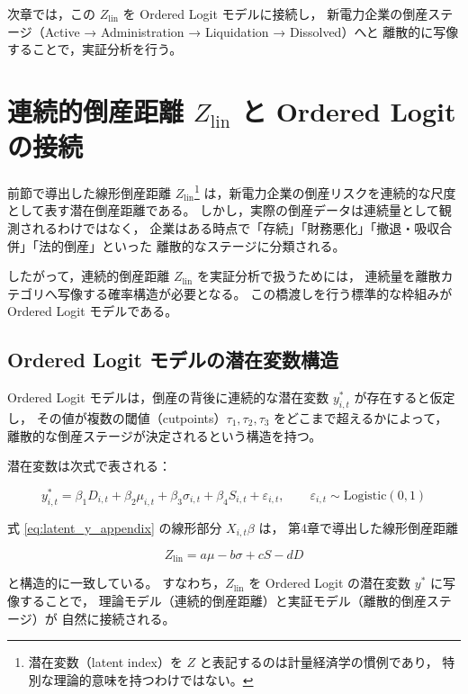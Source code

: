 次章では，この $Z_{\text{lin}}$ を Ordered Logit モデルに接続し，
新電力企業の倒産ステージ（Active → Administration → Liquidation → Dissolved）へと
離散的に写像することで，実証分析を行う。


\section{連続的倒産距離 $Z_{\text{lin}}$ と Ordered Logit の接続}

前節で導出した線形倒産距離 $Z_{\text{lin}}$\footnote{
潜在変数（latent index）を $Z$ と表記するのは計量経済学の慣例であり，
特別な理論的意味を持つわけではない。
} は，新電力企業の倒産リスクを連続的な尺度として表す潜在倒産距離である。
しかし，実際の倒産データは連続量として観測されるわけではなく，
企業はある時点で「存続」「財務悪化」「撤退・吸収合併」「法的倒産」といった
離散的なステージに分類される。

したがって，連続的倒産距離 $Z_{\text{lin}}$ を実証分析で扱うためには，
連続量を離散カテゴリへ写像する確率構造が必要となる。
この橋渡しを行う標準的な枠組みが Ordered Logit モデルである。

\subsection{Ordered Logit モデルの潜在変数構造}

Ordered Logit モデルは，倒産の背後に連続的な潜在変数 $y^*_{i,t}$ が存在すると仮定し，
その値が複数の閾値（cutpoints）$\tau_1, \tau_2, \tau_3$ をどこまで超えるかによって，
離散的な倒産ステージが決定されるという構造を持つ。

潜在変数は次式で表される：

\begin{equation}
y^*_{i,t}
=
\beta_1 D_{i,t}
+ \beta_2 \mu_{i,t}
+ \beta_3 \sigma_{i,t}
+ \beta_4 S_{i,t}
+ \varepsilon_{i,t},
\qquad
\varepsilon_{i,t} \sim \text{Logistic}(0,1)
\label{eq:latent_y_appendix}
\end{equation}

式 \eqref{eq:latent_y_appendix} の線形部分 $X_{i,t}\beta$ は，
第4章で導出した線形倒産距離



\[
Z_{\text{lin}} = a\mu - b\sigma + cS - dD
\]



と構造的に一致している。
すなわち，$Z_{\text{lin}}$ を Ordered Logit の潜在変数 $y^*$ に写像することで，
理論モデル（連続的倒産距離）と実証モデル（離散的倒産ステージ）が
自然に接続される。

